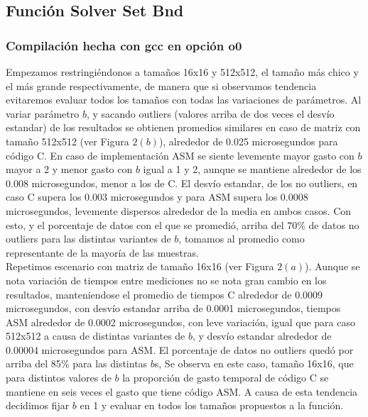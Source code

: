  

 
\subsection{Función Solver Set Bnd }
 \subsubsection{Compilación hecha con gcc en opción o0} 
Empezamos restringiéndonos a tamaños 16x16 y 512x512, el tamaño más chico y el más grande respectivamente, de manera que si observamos tendencia evitaremos evaluar todos los tamaños con todas las variaciones de parámetros. Al variar parámetro $b$, y sacando outliers (valores arriba de dos veces el desvío estandar) de los resultados se obtienen promedios similares en caso de matriz con tamaño 512x512 (ver Figura $2(b)$), alrededor de 0.025 microsegundos para código C. En caso de implementación ASM se siente levemente mayor gasto con $b$ mayor a 2 y menor gasto con $b$ igual a 1 y 2, aunque se mantiene alrededor de los 0.008 microsegundos, menor a los de C. El desvío estandar, de los no outliers, en caso C supera los 0.003 microsegundos y para ASM supera los 0.0008 microsegundos, levemente dispersos alrededor de la media en ambos casos. Con esto, y el porcentaje de datos con el que se promedió, arriba del 70$\%$ de datos no outliers para las distintas variantes de $b$, tomamos al promedio como representante de la mayoría de las muestras.\\
Repetimos escenario con matriz de tamaño 16x16 (ver Figura $2(a)$). Aunque se nota variación de tiempos entre mediciones no se nota gran cambio en los resultados, manteniendose el promedio de tiempos C alrededor de 0.0009 microsegundos, con desvío estandar arriba de 0.0001 microsegundos, tiempos ASM alrededor de 0.0002 microsegundos, con leve variación, igual que para caso 512x512 a causa de distintas variantes de $b$, y desvío estandar alrededor de 0.00004 microsegundos para ASM. El porcentaje de datos no outliers quedó por arriba del 85$\%$ para las distintas $b$s,
Se observa en este caso, tamaño 16x16, que para distintos valores de $b$ la proporción de gasto temporal de código C se mantiene en 
seis veces el gasto que tiene código ASM. A causa de esta tendencia decidimos fijar $b$ en 1 y evaluar en todos los tamaños propuestos a la función. 
\newline


